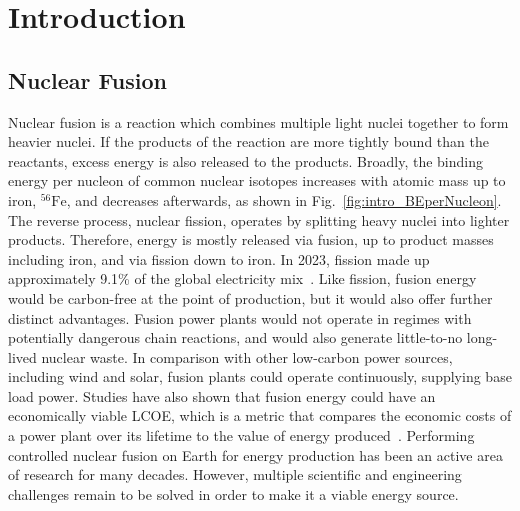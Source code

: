 \chapter{Introduction}%
\label{chap:intro}
\acresetall


\section{Nuclear Fusion}%
\label{sec:intro_whatisfusion}

Nuclear fusion is a reaction which combines multiple light nuclei together to form heavier nuclei.
If the products of the reaction are more tightly bound than the reactants, excess energy is also released to the products.
Broadly, the binding energy per nucleon of common nuclear isotopes increases with atomic mass up to iron, ${}^{56}\text{Fe}$, and decreases afterwards, as shown in Fig.~\ref{fig:intro_BEperNucleon}.
The reverse process, nuclear fission, operates by splitting heavy nuclei into lighter products.
Therefore, energy is mostly released via fusion, up to product masses including iron, and via fission down to iron.
In 2023, fission made up approximately 9.1\% of the global electricity mix~\cite{emberinstitute_statistical_2024}.
Like fission, fusion energy would be carbon-free at the point of production, but it would also offer further distinct advantages.
Fusion power plants would not operate in regimes with potentially dangerous chain reactions, and would also generate little-to-no long-lived nuclear waste.
In comparison with other low-carbon power sources, including wind and solar, fusion plants could operate continuously, supplying base load power.
Studies have also shown that fusion energy could have an economically viable \ac{LCOE}, which is a metric that compares the economic costs of a power plant over its lifetime to the value of energy produced~\cite{griffiths_commercialisation_2022}.
Performing controlled nuclear fusion on Earth for energy production has been an active area of research for many decades.
However, multiple scientific and engineering challenges remain to be solved in order to make it a viable energy source.

